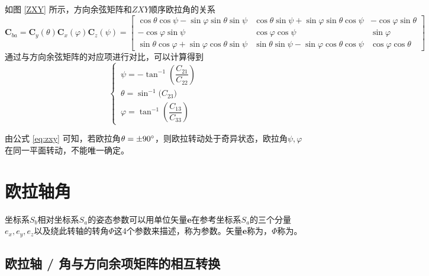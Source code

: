 
如图 \ref{ZXY} 所示，方向余弦矩阵和$ZXY$顺序欧拉角的关系
\begin{equation}
	\bm{C}_{ba} = \bm{C}_y(\theta)\bm{C}_x(\varphi)\bm{C}_z(\psi) =
	\begin{bmatrix}
		\cos \theta \cos \psi - \sin \varphi \sin \theta \sin \psi & \cos \theta \sin \psi + \sin \varphi \sin \theta \cos \psi & -\cos \varphi \sin \theta \\
		-\cos \varphi \sin \psi & \cos \varphi \cos \psi & \sin \varphi \\
		\sin \theta \cos \varphi + \sin \varphi \cos \theta \sin \psi & \sin \theta \sin \psi - \sin \varphi \cos \theta \cos \psi & \cos \varphi \cos \theta 
	\end{bmatrix}
\end{equation}
通过与方向余弦矩阵的对应项进行对比，可以计算得到
\begin{equation}
	\begin{cases}
		\, \psi = -\tan^{-1}\left( \dfrac{C_{21}}{C_{22}} \right) \\
		\, \theta = \sin^{-1}\big( C_{23} \big) \\[0.5em]
		\, \varphi = \tan^{-1} \left( \dfrac{C_{13}}{C_{33}} \right)
	\end{cases}
	\label{eq:zxy}
\end{equation}

由公式 \eqref{eq:zxy} 可知，若欧拉角$\theta = \pm 90 {}^{\circ}$，则欧拉转动处于奇异状态，欧拉角$\psi, \varphi$在同一平面转动，不能唯一确定。
\vspace*{0.5em}



\section{欧拉轴角}
\label{sec: 欧拉轴角}
\vspace*{-1.5em}

{
	坐标系$S_b$相对坐标系$S_a$的姿态参数可以用单位矢量$\bm{e}$在参考坐标系$S_a$的三个分量$e_x, e_y, e_z$以及绕此转轴的转角$\varPhi$这4个参数来描述，称为参数。矢量$\bm{e}$称为，$\varPhi$称为。
}

\subsection{欧拉轴 / 角与方向余项矩阵的相互转换}



